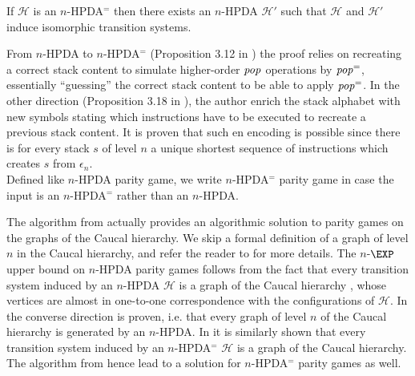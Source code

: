 \documentclass[a4paper,UKenglish,cleveref, autoref, thm-restate]{lipics-v2021}
\renewcommand{\H}{\mathcal{H}}
\begin{document}
\begin{theorem}{\cite{Woeh05, carayol2006automates}}
If $\H$ is an $n$-HPDA$^=$ then there
exists an $n$-HPDA $\H'$ such that
$\H$ and $\H'$ %
induce isomorphic transition systems.
\end{theorem}

\fi

From $n$-HPDA to $n$-HPDA$^=$ (Proposition 3.12 in \cite{Woeh05}) the proof relies on recreating a correct stack content to simulate higher-order 
$\text{\textit{pop}}$ operations by $\text{\textit{pop}}^=$, essentially ``guessing'' the correct stack content to be able to apply $\text{\textit{pop}}^=$. 
In the other direction (Proposition 3.18 in \cite{Woeh05}), 
the author
enrich the stack alphabet with new symbols stating which 
instructions have to be executed to recreate a
previous stack content. It is proven that such en encoding is possible since
there is 
for every stack $s$ of level $n$
 a unique shortest sequence of instructions which creates $s$ from
$\epsilon_n$. \\

Defined like {\sc $n$-HPDA parity game}, we write {\sc $n$-HPDA$^=$ parity game}  
in case the input is an $n$-HPDA$^=$ rather than an $n$-HPDA.



The algorithm from \cite{Cach03} actually provides an algorithmic solution to parity games on the graphs of the Caucal hierarchy. 
We skip a formal definition of a graph of level $n$ in the Caucal hierarchy, and refer the reader
to \cite{Cau02mfcs} for more details.
The $n$-$\EXP$ upper bound on $n$-HPDA parity games follows from the fact that every transition system induced by an $n$-HPDA $\H$ is a graph of the Caucal hierarchy \cite{Cach03, Woeh05},
whose vertices are almost in one-to-one correspondence with the configurations of $\H$.
In \cite{Woeh05} the converse direction is proven, i.e. that every graph of level $n$
of the Caucal hierarchy is generated by an $n$-HPDA.  
%
%
In \cite{carayol2006automates}
it is similarly shown that
every transition system induced by an $n$-HPDA$^=$ $\H$ is a graph of the Caucal hierarchy.
%
%
The algorithm from \cite{Cach03} hence lead to a solution for
$n$-HPDA$^=$ parity games as well.
\end{document}
